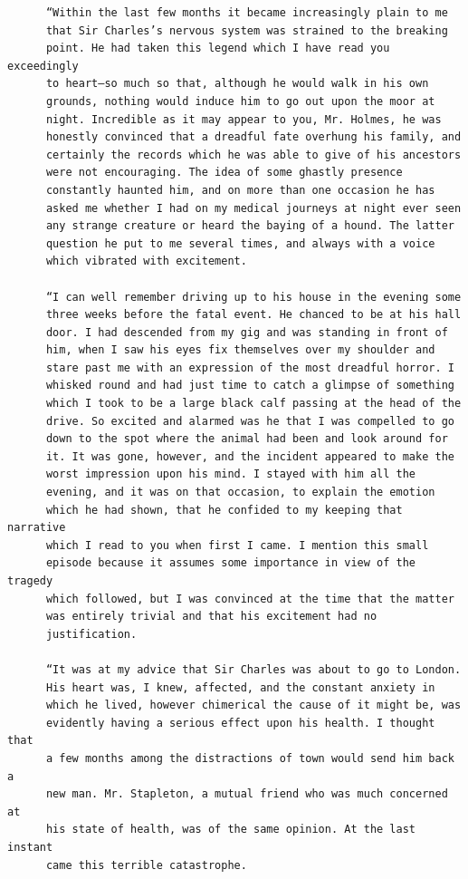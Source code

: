 \documentclass{article}
\begin{document}
\begin{verbatim}
      “Within the last few months it became increasingly plain to me
      that Sir Charles’s nervous system was strained to the breaking
      point. He had taken this legend which I have read you exceedingly
      to heart—so much so that, although he would walk in his own
      grounds, nothing would induce him to go out upon the moor at
      night. Incredible as it may appear to you, Mr. Holmes, he was
      honestly convinced that a dreadful fate overhung his family, and
      certainly the records which he was able to give of his ancestors
      were not encouraging. The idea of some ghastly presence
      constantly haunted him, and on more than one occasion he has
      asked me whether I had on my medical journeys at night ever seen
      any strange creature or heard the baying of a hound. The latter
      question he put to me several times, and always with a voice
      which vibrated with excitement.

      “I can well remember driving up to his house in the evening some
      three weeks before the fatal event. He chanced to be at his hall
      door. I had descended from my gig and was standing in front of
      him, when I saw his eyes fix themselves over my shoulder and
      stare past me with an expression of the most dreadful horror. I
      whisked round and had just time to catch a glimpse of something
      which I took to be a large black calf passing at the head of the
      drive. So excited and alarmed was he that I was compelled to go
      down to the spot where the animal had been and look around for
      it. It was gone, however, and the incident appeared to make the
      worst impression upon his mind. I stayed with him all the
      evening, and it was on that occasion, to explain the emotion
      which he had shown, that he confided to my keeping that narrative
      which I read to you when first I came. I mention this small
      episode because it assumes some importance in view of the tragedy
      which followed, but I was convinced at the time that the matter
      was entirely trivial and that his excitement had no
      justification.

      “It was at my advice that Sir Charles was about to go to London.
      His heart was, I knew, affected, and the constant anxiety in
      which he lived, however chimerical the cause of it might be, was
      evidently having a serious effect upon his health. I thought that
      a few months among the distractions of town would send him back a
      new man. Mr. Stapleton, a mutual friend who was much concerned at
      his state of health, was of the same opinion. At the last instant
      came this terrible catastrophe.


\end{verbatim}
\end{document}
